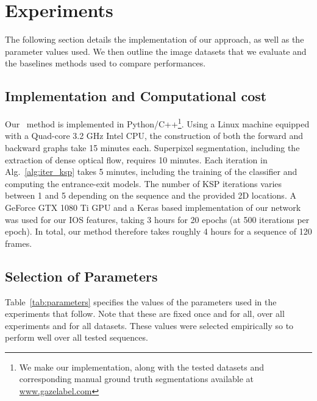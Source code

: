 \section{Experiments}
\label{sec:experiments}
The following section details the implementation of our approach, as well as the parameter values used. We then outline the image datasets that we evaluate and the baselines methods used to compare performances.

\subsection{Implementation and Computational cost}
Our \KSP ~method is implemented in Python/C++\footnote{We make our implementation, along with the tested datasets and corresponding manual ground truth segmentations available at \label{fn:website}\href{www.gazelabel.com}{www.gazelabel.com}}. Using a Linux machine equipped with a Quad-core 3.2 GHz Intel CPU, the construction of both the forward and backward graphs take 15 minutes each. Superpixel segmentation, including the extraction of dense optical flow, requires 10 minutes. Each iteration in Alg.~\ref{alg:iter_ksp} takes 5 minutes, including the training of the classifier and computing the entrance-exit models. The number of KSP iterations varies between 1 and 5 depending on the sequence and the provided 2D locations. A GeForce GTX 1080 Ti GPU and a Keras based implementation of our network was used for our IOS features, taking 3 hours for 20 epochs (at 500 iterations per epoch).
In total, our method therefore takes roughly 4 hours for a sequence of 120 frames.

\subsection{Selection of Parameters}
Table~\ref{tab:parameters} specifies the values of the parameters used in the experiments that follow. Note that these are fixed once and for all, over all experiments and for all datasets. These values were selected empirically so to perform well over all tested sequences.

